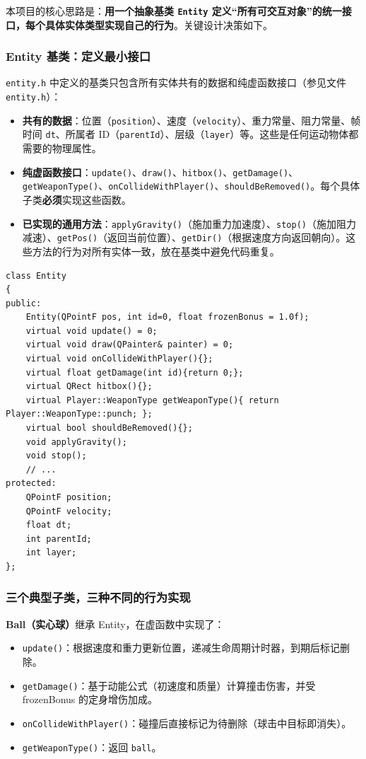 \documentclass[utf8]{ctexart}
\begin{document}
本项目的核心思路是：\textbf{用一个抽象基类 \texttt{Entity} 定义“所有可交互对象”的统一接口，每个具体实体类型实现自己的行为}。关键设计决策如下。

\subsubsection{Entity 基类：定义最小接口}

\texttt{entity.h} 中定义的基类只包含所有实体共有的数据和纯虚函数接口（参见文件 \texttt{entity.h}）：

\begin{itemize}
  \item \textbf{共有的数据}：位置（\texttt{position}）、速度（\texttt{velocity}）、重力常量、阻力常量、帧时间 \texttt{dt}、所属者 ID（\texttt{parentId}）、层级（\texttt{layer}）等。这些是任何运动物体都需要的物理属性。
  \item \textbf{纯虚函数接口}：\texttt{update()}、\texttt{draw()}、\texttt{hitbox()}、\texttt{getDamage()}、\texttt{getWeaponType()}、\texttt{onCollideWithPlayer()}、\texttt{shouldBeRemoved()}。每个具体子类\textbf{必须}实现这些函数。
  \item \textbf{已实现的通用方法}：\texttt{applyGravity()}（施加重力加速度）、\texttt{stop()}（施加阻力减速）、\texttt{getPos()}（返回当前位置）、\texttt{getDir()}（根据速度方向返回朝向）。这些方法的行为对所有实体一致，放在基类中避免代码重复。
\end{itemize}

\begin{verbatim}
class Entity
{
public:
    Entity(QPointF pos, int id=0, float frozenBonus = 1.0f);
    virtual void update() = 0;
    virtual void draw(QPainter& painter) = 0;
    virtual void onCollideWithPlayer(){};
    virtual float getDamage(int id){return 0;};
    virtual QRect hitbox(){};
    virtual Player::WeaponType getWeaponType(){ return Player::WeaponType::punch; };
    virtual bool shouldBeRemoved(){};
    void applyGravity();
    void stop();
    // ...
protected:
    QPointF position;
    QPointF velocity;
    float dt;
    int parentId;
    int layer;
};
\end{verbatim}

\subsubsection{三个典型子类，三种不同的行为实现}

\textbf{Ball（实心球）}继承 Entity，在虚函数中实现了：
\begin{itemize}
  \item \texttt{update()}：根据速度和重力更新位置，递减生命周期计时器，到期后标记删除。
  \item \texttt{getDamage()}：基于动能公式（初速度和质量）计算撞击伤害，并受 frozenBonus 的定身增伤加成。
  \item \texttt{onCollideWithPlayer()}：碰撞后直接标记为待删除（球击中目标即消失）。
  \item \texttt{getWeaponType()}：返回 \texttt{ball}。
\end{itemize}
\end{document}
